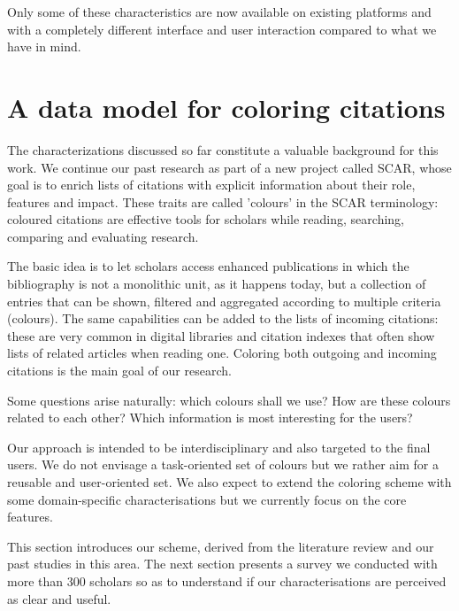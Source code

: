\documentclass[runningheads,a4paper]{llncs}
\begin{document}
Only some of these characteristics are now available on existing platforms and with a completely different interface and user interaction compared to what we have in mind.

\section{A data model for coloring citations}\label{__RefHeading__183527_273733062}

The characterizations discussed so far constitute a valuable background for this work. We continue our past research as part of a new project called SCAR, whose goal is to enrich lists of citations with explicit information about their role, features and impact. These traits are called 'colours' in the SCAR terminology: coloured citations are effective tools for scholars while reading, searching, comparing and evaluating research.

The basic idea is to let scholars access enhanced publications in which the bibliography is not a monolithic unit, as it happens today, but a collection of entries that can be shown, filtered and aggregated according to multiple criteria (colours). The same capabilities can be added to the lists of incoming citations: these are very common in digital libraries and citation indexes that often show lists of related articles when reading one. Coloring both outgoing and incoming citations is the main goal of our research.

Some questions arise naturally: which colours shall we use? How are these colours related to each other? Which information is most interesting for the users?

Our approach is intended to be interdisciplinary and also targeted to the final users. We do not envisage a task-oriented set of colours but we rather aim for a reusable and user-oriented set. We also expect to extend the coloring scheme with some domain-specific characterisations but we currently focus on the core features.

This section introduces our scheme, derived from the literature review and our past studies in this area. The next section presents a survey we conducted with more than 300 scholars so as to understand if our characterisations are perceived as clear and useful.
\end{document}
